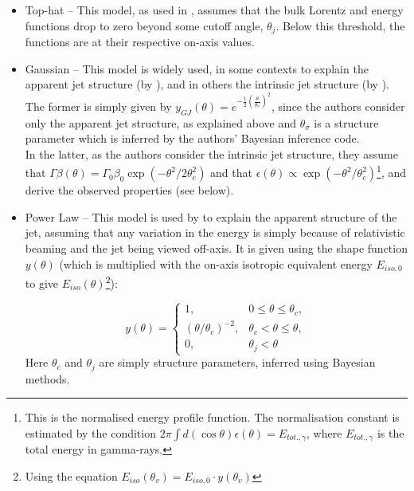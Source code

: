     \begin{itemize}

        \item Top-hat -- This model, as used in \cite{saleem_2020B}, assumes
            that the bulk Lorentz and energy functions drop to zero beyond some cutoff
            angle, $\theta_j$. Below this threshold, the functions are at their
            respective on-axis values.

       \item Gaussian -- This model is widely used, in some contexts to explain the
           apparent jet structure (by \cite{hayes_2020}), and in others the
           intrinsic jet structure (by \cite{saleem_2020B}). The former is
           simply given by $y_{GJ}(\theta) = e^{- \frac{1}{2} \left(
           \frac{\theta}{\theta_{\sigma}} \right)^2}$, since the authors consider only
           the apparent jet structure, as explained above and $\theta_\sigma$ is a
           structure parameter which is inferred by the authors' Bayesian inference
           code.\\
           In the latter, as the authors consider the intrinsic jet structure, they
           assume that $\Gamma \beta (\theta) = \Gamma_0 \beta_0 \exp\left(- \theta^2 /
           2\theta_c^2\right)$ and that $\epsilon (\theta) \propto \exp(- \theta^2 /
           \theta_c^2)$\footnote{
               This is the normalised energy profile function.  The normalisation
               constant is estimated by the condition $2\pi \int d(\cos \theta)
               \epsilon(\theta) = E_{tot., \gamma}$, where $E_{tot., \gamma}$ is the
               total energy in gamma-rays.
           }, and derive the observed properties (see below).

        \item Power Law -- This model is used by \cite{hayes_2020} to explain
            the apparent structure of the jet, assuming that any variation in the energy
            is simply because of relativistic beaming and the jet being viewed off-axis.
            It is given using the shape function $y(\theta)$ (which is multiplied with
            the on-axis isotropic equivalent energy $E_{iso, 0}$ to give
            $E_{iso}(\theta)$\footnote{Using the equation $E_{iso}(\theta_v) = E_{iso,
            0} \cdot y(\theta_v)$}):

                \begin{equation}
                    \label{eq:5}
                    y(\theta) = \begin{cases}
                                    1,
                                        & 0 \leq \theta \leq \theta_c, \\
                                    (\theta/\theta_c)^{-2},
                                        & \theta_c < \theta \leq \theta, \\
                                    0,
                                        & \theta_j < \theta
                                \end{cases}
                \end{equation}
                Here $\theta_c$ and $\theta_j$ are simply structure parameters, inferred
                using Bayesian methods.


\end{itemize}

